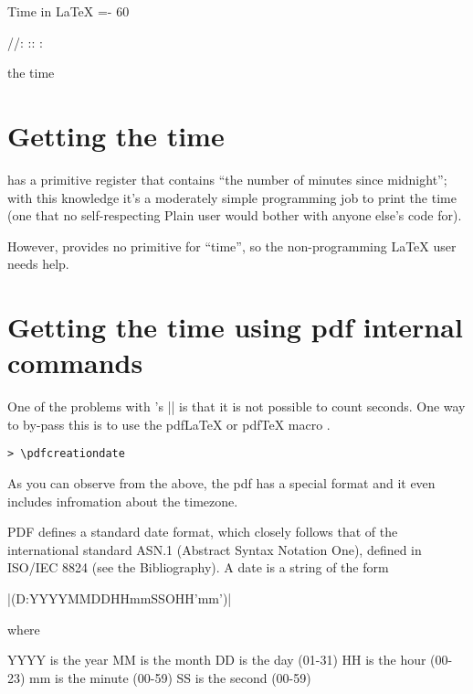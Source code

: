 \begin{texexample}{Time in LaTeX}{}
\makeatletter
\count@\time
\divide{}
=-\count@
\multiply{} 60
\advance{} \time

\edef\today{%
\the\year/\two@digits{\the\month}/\two@digits{\the\day}:%
\two@digits{\the\count@}:}


\today:   \the{}:  \the\count@

the time \the\time
\makeatother
\end{texexample}




\section{Getting the time}

\tex has a primitive register that contains “the number of minutes since midnight”; with this knowledge it’s a moderately simple programming job to print the time (one that no self-respecting Plain \tex user would bother with anyone else’s code for).

However, \latex provides no primitive for “time”, so the non-programming LaTeX user needs help.


\section*{Getting the time using pdf internal commands}

One of the problems with \tex's |\time| is that it is not possible to count seconds. One way to by-pass this is to use the pdfLaTeX or pdfTeX macro
.


\texttt{> \textbackslash pdfcreationdate}

\texttt{\pdfcreationdate}

As you can observe from the above, the pdf has a special format and it even includes infromation about the timezone.

PDF defines a standard date format, which closely follows that of the international standard ASN.1 (Abstract Syntax Notation One), defined in ISO/IEC 8824 (see the Bibliography). A date is a string of the form

|(D:YYYYMMDDHHmmSSOHH'mm')|

where

\begin{teX}
YYYY is the year
MM is the month
DD is the day (01-31)
HH is the hour (00-23)
mm is the minute (00-59)
SS is the second (00-59)
\end{teX}


